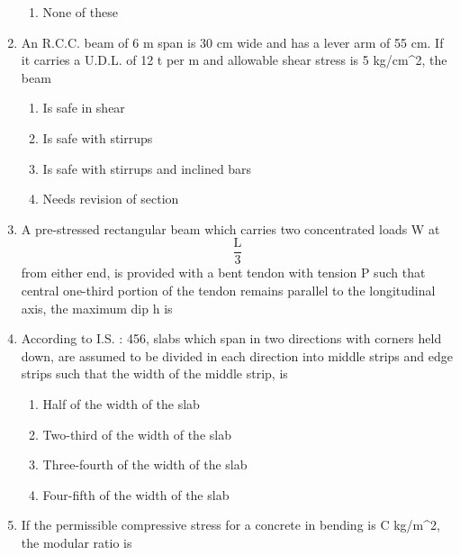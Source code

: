 \documentclass[11pt,a4paper]{article}
\begin{document}
\begin{enumerate}
\begin{enumerate}[label=\Alph*.]
\item{None of these}
\end{enumerate}
\item{An R.C.C. beam of 6 m span is 30 cm wide and has a lever arm of 55 cm. If it carries a U.D.L. of 12 t per m and allowable shear stress is 5 kg/cm\^{}2, the beam
}
\begin{enumerate}[label=\Alph*.]
\item{Is safe in shear}
\item{Is safe with stirrups}
\item{Is safe with stirrups and inclined bars}
\item{Needs revision of section}
\end{enumerate}
\item{A pre-stressed rectangular beam which carries two concentrated loads W at $$\frac{{\text{L}}}{3}$$ from either end, is provided with a bent tendon with tension P such that central one-third portion of the tendon remains parallel to the longitudinal axis, the maximum dip h is}
\\
\item{According to I.S. : 456, slabs which span in two directions with corners held down, are assumed to be divided in each direction into middle strips and edge strips such that the width of the middle strip, is}
\begin{enumerate}[label=\Alph*.]
\item{Half of the width of the slab}
\item{Two-third of the width of the slab}
\item{Three-fourth of the width of the slab}
\item{Four-fifth of the width of the slab}
\end{enumerate}
\item{If the permissible compressive stress for a concrete in bending is C kg/m\^{}2, the modular ratio is
}
\\
\end{enumerate}
\end{document}
